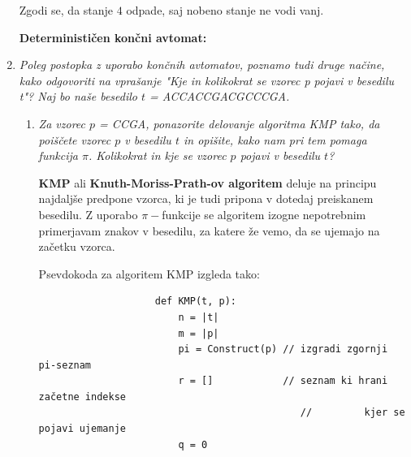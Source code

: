 \documentclass{article}
\begin{document}
\begin{enumerate}
		Zgodi se, da stanje $4$ odpade, saj nobeno stanje ne vodi vanj.

		\textbf{Determinističen končni avtomat:}

		\begin{center}
		\end{center}

		\newpage

	\item \textit{Poleg postopka z uporabo končnih avtomatov, poznamo tudi druge načine, kako
			odgovoriti na vprašanje "Kje in kolikokrat se vzorec p pojavi v besedilu t"? Naj bo naše
		besedilo $t$ = ACCACCGACGCCCGA.}

		\begin{enumerate}
			\item \textit{Za vzorec $p$ = CCGA, ponazorite delovanje algoritma KMP tako, da poiščete
					vzorec $p$ v besedilu $t$ in opišite, kako nam pri tem pomaga funkcija $\pi$.
				Kolikokrat in kje se vzorec $p$ pojavi v besedilu $t$?}

				\textbf{KMP} ali \textbf{Knuth-Moriss-Prath-ov algoritem} deluje na principu najdaljše predpone vzorca,
				ki je tudi pripona v dotedaj preiskanem besedilu. Z uporabo $\pi-$funkcije se
				algoritem izogne nepotrebnim primerjavam znakov v besedilu, za katere že vemo, da
				se ujemajo na začetku vzorca.

				Psevdokoda za algoritem KMP izgleda tako:

				\begin{verbatim}
					def KMP(t, p):
						n = |t|
						m = |p|
						pi = Construct(p) // izgradi zgornji pi-seznam
						r = []            // seznam ki hrani začetne indekse
											 //         kjer se pojavi ujemanje
						q = 0


\end{verbatim}
\end{enumerate}
\end{enumerate}
\end{document}
